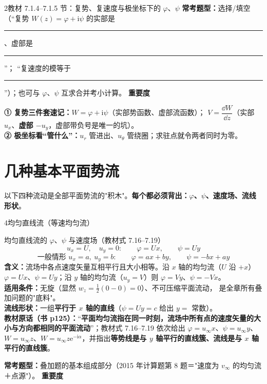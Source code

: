 \begin{kaodian}{2}{教材 7.1.4--7.1.5 节：复势、复速度与极坐标下的 $\varphi$、$\psi$}
\textbf{常考题型：}选择/填空（“复势 $W(z)=\varphi+\mathrm{i}\psi$ 的实部是\rule{1.8cm}{0.4pt}、虚部是\rule{1.8cm}{0.4pt}”；
“复速度的模等于\rule{1.6cm}{0.4pt}”）；也可与 $\varphi$、$\psi$ 互求合并考小计算。
\textbf{重要度 }\quad{}\quad{}

\begin{banfa}
\textbf{① 复势三件套速记：}$W=\varphi+\mathrm{i}\psi$（实部势函数、虚部流函数）；
$V=\dfrac{\dd W}{\dd z}$（实部 $u_x$、\textbf{虚部 $-u_y$}，虚部带负号是唯一的坑）。\\
\textbf{② 极坐标看“管什么”：}$u_r$ 管进出、$u_\theta$ 管绕圈；求驻点就令两者同时为零。
\end{banfa}
\end{kaodian}

\section{几种基本平面势流}

以下四种流动是全部平面势流的"积木"。\textbf{每个都必须背出：$\varphi$、$\psi$、速度场、流线形状}。

\begin{kaodian}{4}{均匀直线流（等速均匀流）}
\begin{gongshi}{均匀直线流的 $\varphi$、$\psi$ 与速度场（教材式 7.16--7.19）}
\[ u_x=U,\quad u_y=0:\qquad \varphi=Ux,\qquad \psi=Uy \]
\[ \text{一般情形 } u_x=a,\ u_y=b:\qquad \varphi=ax+by,\qquad \psi=-bx+ay \]
\textbf{含义：}流场中各点速度矢量互相平行且大小相等。沿 $x$ 轴的均匀流（$U$ 沿 $+x$）
$\varphi=Ux$、$\psi=Uy$；沿 $y$ 轴的均匀流（$u_y=V$）则 $\varphi=Vy$、$\psi=-Vx$。\\
\textbf{适用条件：}无旋（显然 $w_z=\frac12(0-0)=0$）、不可压缩平面流动，
是全章所有叠加问题的"底料"。\\
\textbf{流线形状：}一组\textbf{平行于 $x$ 轴的直线}（$\psi=Uy=c$ 给出 $y=$ 常数）。\\
\textbf{教材原话（书 p125）：}“\textbf{平面均匀流指在同一时刻，流场中所有点的速度矢量的大小与方向都相同的平面流动}”；教材式 7.16--7.19 依次给出 $\varphi=u_\infty x$、$\psi=u_\infty y$、$W=u_\infty z$、$W=u_\infty z\mathrm{e}^{-\mathrm{i}\alpha}$，并指出\textbf{等势线是与 $y$ 轴平行的直线簇、流线是与 $x$ 轴平行的直线簇}。
\end{gongshi}
\textbf{常考题型：}叠加题的基本组成部分（2015 年计算题第 8 题＝"速度为 $v_\infty$ 的均匀流＋点源"）。
\textbf{重要度 }\quad{}\quad{}
\end{kaodian}

